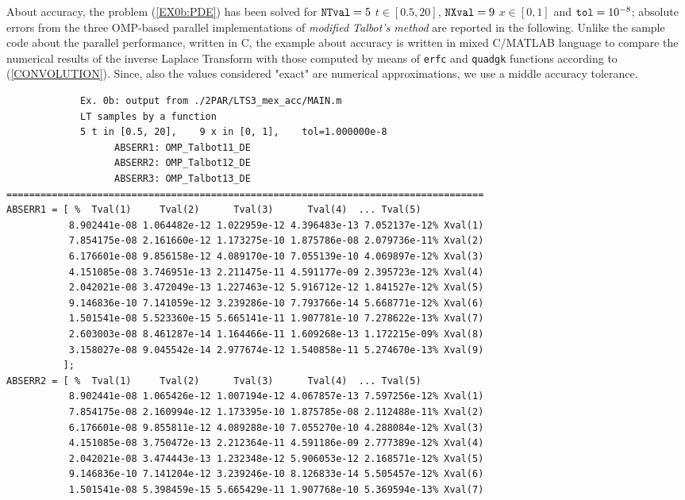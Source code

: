 \documentclass[a4paper,10pt]{report}%
\begin{document}
About accuracy, the problem (\ref{EX0b:PDE}) \cite{DUFFY:2004} has been solved for ${\tt NTval}=5$ $t\in[0.5,20]$,
${\tt NXval}=9$ $x\in[0,1]$ and ${\tt tol}=10^{-8}$; absolute errors from the three OMP-based parallel
implementations of {\em modified Talbot's method} are reported in the following.
Unlike the sample code about the parallel performance, written in C, the example about accuracy is written in
mixed C/MATLAB language to compare the numerical results of the inverse Laplace Transform with those computed by means of {\tt erfc} and {\tt quadgk} functions according to (\ref{CONVOLUTION}).
Since, also the values considered "exact" are numerical approximations, we use a middle accuracy tolerance.
\begin{lstlisting}
             Ex. 0b: output from ./2PAR/LTS3_mex_acc/MAIN.m
             LT samples by a function
             5 t in [0.5, 20],    9 x in [0, 1],    tol=1.000000e-8
                   ABSERR1: OMP_Talbot11_DE
                   ABSERR2: OMP_Talbot12_DE
                   ABSERR3: OMP_Talbot13_DE
====================================================================================
ABSERR1 = [ %  Tval(1)     Tval(2)      Tval(3)      Tval(4)  ... Tval(5)
           8.902441e-08 1.064482e-12 1.022959e-12 4.396483e-13 7.052137e-12% Xval(1)
           7.854175e-08 2.161660e-12 1.173275e-10 1.875786e-08 2.079736e-11% Xval(2)
           6.176601e-08 9.856158e-12 4.089170e-10 7.055139e-10 4.069897e-12% Xval(3)
           4.151085e-08 3.746951e-13 2.211475e-11 4.591177e-09 2.395723e-12% Xval(4)
           2.042021e-08 3.472049e-13 1.227463e-12 5.916712e-12 1.841527e-12% Xval(5)
           9.146836e-10 7.141059e-12 3.239286e-10 7.793766e-14 5.668771e-12% Xval(6)
           1.501541e-08 5.523360e-15 5.665141e-11 1.907781e-10 7.278622e-13% Xval(7)
           2.603003e-08 8.461287e-14 1.164466e-11 1.609268e-13 1.172215e-09% Xval(8)
           3.158027e-08 9.045542e-14 2.977674e-12 1.540858e-11 5.274670e-13% Xval(9)
          ];
ABSERR2 = [ %  Tval(1)     Tval(2)      Tval(3)      Tval(4)  ... Tval(5)
           8.902441e-08 1.065426e-12 1.007194e-12 4.067857e-13 7.597256e-12% Xval(1)
           7.854175e-08 2.160994e-12 1.173395e-10 1.875785e-08 2.112488e-11% Xval(2)
           6.176601e-08 9.855811e-12 4.089288e-10 7.055270e-10 4.288084e-12% Xval(3)
           4.151085e-08 3.750472e-13 2.212364e-11 4.591186e-09 2.777389e-12% Xval(4)
           2.042021e-08 3.474443e-13 1.232348e-12 5.906053e-12 2.168571e-12% Xval(5)
           9.146836e-10 7.141204e-12 3.239246e-10 8.126833e-14 5.505457e-12% Xval(6)
           1.501541e-08 5.398459e-15 5.665429e-11 1.907768e-10 5.369594e-13% Xval(7)

\end{lstlisting}
\end{document}
